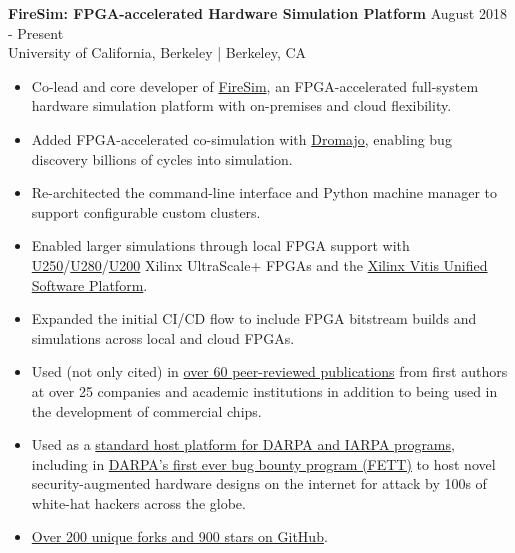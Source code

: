 \documentclass[line]{res}
\begin{document}
\begin{resume}
\label{sec:firesim}
\textbf{FireSim: FPGA-accelerated Hardware Simulation Platform} \hfill August 2018 - Present
\\
University of California, Berkeley | Berkeley, CA
\\
\vspace{-3mm}
\begin{itemize}
\item Co-lead and core developer of \href{https://fires.im/}{FireSim}, an FPGA-accelerated full-system hardware simulation platform with on-premises and cloud flexibility.
\item Added FPGA-accelerated co-simulation with \href{https://github.com/chipsalliance/dromajo}{Dromajo}, enabling bug discovery billions of cycles into simulation.
\item Re-architected the command-line interface and Python machine manager to support configurable custom clusters.
\item Enabled larger simulations through local FPGA support with \href{https://www.amd.com/en/products/accelerators/alveo/u250/a-u250-a64g-pq-g.html}{U250}/\href{https://docs.amd.com/r/en-US/ds963-u280}{U280}/\href{https://www.amd.com/en/products/accelerators/alveo/u200/a-u200-a64g-pq-g.html}{U200} Xilinx UltraScale+ FPGAs and the \href{https://www.amd.com/en/products/software/adaptive-socs-and-fpgas/vitis.html}{Xilinx Vitis Unified Software Platform}.
\item Expanded the initial CI/CD flow to include FPGA bitstream builds and simulations across local and cloud FPGAs.
\item Used (not only cited) in \href{https://fires.im/publications/#userpapers}{over 60 peer-reviewed publications} from first authors at over 25 companies and academic institutions in addition to being used in the development of commercial chips.
\item Used as a \href{https://fires.im/workshop-2023/}{standard host platform for DARPA and IARPA programs}, including in \href{https://fett.darpa.mil/}{DARPA's first ever bug bounty program (FETT)} to host novel security-augmented hardware designs on the internet for attack by 100s of white-hat hackers across the globe.
\item \href{https://github.com/firesim/firesim}{Over 200 unique forks and 900 stars on GitHub}.
\end{itemize}

\vspace{-2mm}


\end{resume}
\end{document}
